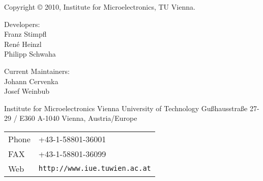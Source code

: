 
\clearpage

Copyright {\copyright} 2010, Institute for Microelectronics, TU Vienna.

\vspace{2.5cm}

Developers:\\ 

Franz Stimpfl\\
Ren\'e Heinzl\\
Philipp Schwaha\\

\vspace{2.5cm}

Current Maintainers: \\

Johann Cervenka\\
Josef Weinbub\\


\vspace{7.0cm}

Institute for Microelectronics\newline
Vienna University of Technology\newline
Gu\ss hausstra\ss e 27-29 / E360\newline
A-1040 Vienna, Austria/Europe\newline


\begin{tabular}{ll}
Phone  & +43-1-58801-36001\\
FAX    & +43-1-58801-36099\\
Web    & \texttt{http://www.iue.tuwien.ac.at}
\end{tabular}



